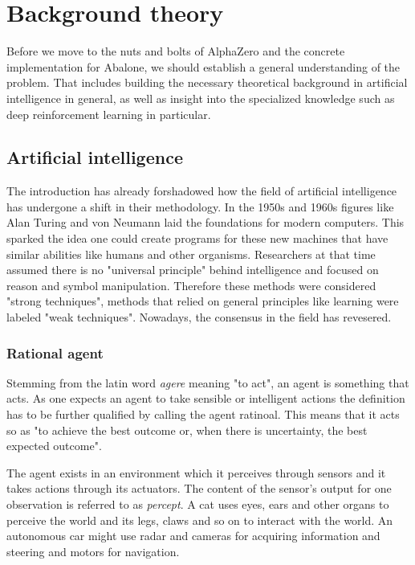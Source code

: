 \chapter{Background theory}
Before we move to the nuts and bolts of AlphaZero and the concrete implementation for Abalone, we should establish a general understanding of the problem. That includes building the necessary theoretical background in artificial intelligence in general, as well as insight into the specialized knowledge such as deep reinforcement learning in particular.

\section{Artificial intelligence}
The introduction has already forshadowed how the field of artificial intelligence has undergone a shift in their methodology. In the 1950s and 1960s figures like Alan Turing and von Neumann laid the foundations for modern computers. This sparked the idea one could create programs for these new machines that have similar abilities like humans and other organisms. Researchers at that time assumed there is no "universal principle" behind intelligence and focused on reason and symbol manipulation. Therefore these methods were considered "strong techniques", methods that relied on general principles like learning were labeled "weak techniques". Nowadays, the consensus in the field has revesered. \cite[p. 8f.]{sutton_reinforcement_2018}


\subsection{Rational agent}
Stemming from the latin word \textit{agere} meaning "to act", an agent is something that acts. As one expects an agent to take sensible or intelligent actions the definition has to be further qualified by calling the agent ratinoal. This means that it acts so as "to achieve the best outcome or, when there is uncertainty, the best expected outcome". \cite[p. 36]{russell_artificial_2021}

The agent exists in an environment which it perceives through sensors and it takes actions through its actuators. The content of the sensor's output for one observation is referred to as \textit{percept}. A cat uses eyes, ears and other organs to perceive the world and its legs, claws and so on to interact with the world. An autonomous car might use radar and cameras for acquiring information and steering and motors for navigation.

